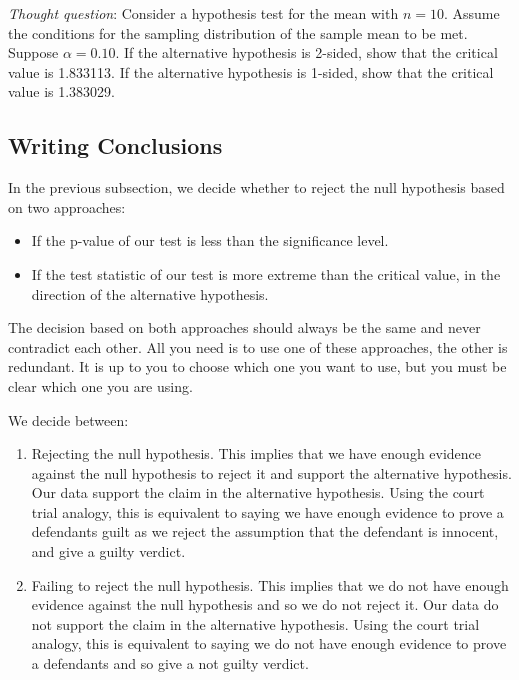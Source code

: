 \documentclass[
]{book}
\providecommand{\tightlist}{%
  \setlength{\itemsep}{0pt}\setlength{\parskip}{0pt}}
\begin{document}
\emph{Thought question}: Consider a hypothesis test for the mean with \(n=10\). Assume the conditions for the sampling distribution of the sample mean to be met. Suppose \(\alpha=0.10\). If the alternative hypothesis is 2-sided, show that the critical value is 1.833113. If the alternative hypothesis is 1-sided, show that the critical value is 1.383029.

\hypertarget{writing-conclusions}{%
\subsection{Writing Conclusions}\label{writing-conclusions}}

In the previous subsection, we decide whether to reject the null hypothesis based on two approaches:

\begin{itemize}
\tightlist
\item
  If the p-value of our test is less than the significance level.
\item
  If the test statistic of our test is more extreme than the critical value, in the direction of the alternative hypothesis.
\end{itemize}

The decision based on both approaches should always be the same and never contradict each other. All you need is to use one of these approaches, the other is redundant. It is up to you to choose which one you want to use, but you must be clear which one you are using.

We decide between:

\begin{enumerate}
\def\labelenumi{\arabic{enumi}.}
\item
  Rejecting the null hypothesis. This implies that we have enough evidence against the null hypothesis to reject it and support the alternative hypothesis. Our data support the claim in the alternative hypothesis. Using the court trial analogy, this is equivalent to saying we have enough evidence to prove a defendants guilt as we reject the assumption that the defendant is innocent, and give a guilty verdict.
\item
  Failing to reject the null hypothesis. This implies that we do not have enough evidence against the null hypothesis and so we do not reject it. Our data do not support the claim in the alternative hypothesis. Using the court trial analogy, this is equivalent to saying we do not have enough evidence to prove a defendants and so give a not guilty verdict.
\end{enumerate}
\end{document}
